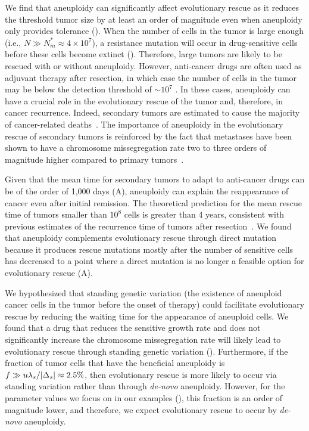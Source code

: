 \documentclass[12pt]{extarticle}
\begin{document}
We find that aneuploidy can significantly affect evolutionary rescue as it reduces the threshold tumor size by at least an order of magnitude even when aneuploidy only provides tolerance ().
When the number of cells in the tumor is large enough (i.e., $N\gg N_m^*\approx 4\times10^7$), a resistance mutation will occur in drug-sensitive cells before these cells become extinct (). Therefore, large tumors are likely to be rescued with or without aneuploidy.
However, anti-cancer drugs are often used as adjuvant therapy after resection, in which case the number of cells in the tumor may be below the detection threshold of $\sim10^7$  \citep{bozic2013evolutionary}. In these cases, aneuploidy can have a crucial role in the evolutionary rescue of the tumor and, therefore, in cancer recurrence. Indeed, secondary tumors are estimated to cause the majority of cancer-related deaths~\citep{chaffer2011perspective}. The importance of aneuploidy in the evolutionary rescue of secondary tumors is reinforced by the fact that metastases have been shown to have a chromosome missegregation rate two to three orders of magnitude higher compared to primary tumors~\citep{kimmel2023intra}.

Given that the mean time for secondary tumors to adapt to anti-cancer drugs can be of the order of 1,000 days (A), aneuploidy can explain the reappearance of cancer even after initial remission. The theoretical prediction for the mean rescue time of tumors smaller than $10^8$ cells is greater than 4 years, consistent with previous estimates of the recurrence time of tumors after resection~\citep{avanzini2019cancer}. We found that aneuploidy complements evolutionary rescue through direct mutation because it produces rescue mutations mostly after the number of sensitive cells has decreased to a point where a direct mutation is no longer a feasible option for evolutionary rescue (A).

We hypothesized that standing genetic variation (the existence of aneuploid cancer cells in the tumor before the onset of therapy) could facilitate evolutionary rescue by reducing the waiting time for the appearance of aneuploid cells. We found that a drug that reduces the sensitive growth rate and does not significantly increase the chromosome missegregation rate will likely lead to evolutionary rescue through standing genetic variation ().
Furthermore, if the fraction of tumor cells that have the beneficial aneuploidy is $f \gg u \lambda_s / \abs{\Delta_s} \approx2.5\%$, then evolutionary rescue is more likely to occur via standing variation rather than through \emph{de-novo} aneuploidy. However, for the parameter values we focus on in our examples (), this fraction is an order of magnitude lower, and therefore, we expect evolutionary rescue to occur by \emph{de-novo} aneuploidy.
\end{document}
